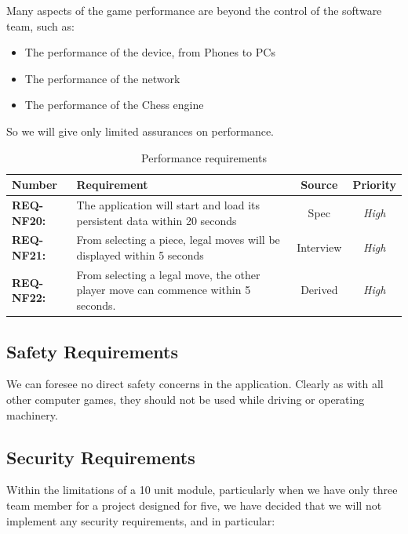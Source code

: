 \documentclass[a4paper,10pt]{article}
\begin{document}
Many aspects of the game performance are beyond the control of the software team, such as:
\begin{itemize}
  \item The performance of the device, from Phones to PCs
  \item The performance of the network
  \item The performance of the Chess engine
\end{itemize}

So we will give only limited assurances on performance. 

\begin{table}[H]
\caption{Performance  requirements}
\label{table:PerfReqs}
\begin{tabular}{|| l | p{10.5cm}  |  c  | c ||} \hline  

\textbf{Number} & \textbf{Requirement} & \textbf{Source} & \textbf{Priority}\\ \hline

\textbf{REQ-NF20:}  & 
The application will start and load its persistent data within 20 seconds
& Spec & \textit{ High} \\

\textbf{REQ-NF21:} 
&  From selecting a piece, legal moves will be displayed within 5 seconds
& Interview  &  \textit{High}\\

\textbf{REQ-NF22:} 
&  From selecting a legal move, the other player move can commence within 5 seconds.
& Derived  &  \textit{High}\\

\hline
\end{tabular}
\end{table}


\subsection{Safety Requirements}

We can foresee no direct safety concerns in the application. Clearly as with all other computer games, they should not be used while driving or operating machinery. 

\subsection{Security Requirements}

Within the limitations of a 10 unit module, particularly when we have only three team member for a project designed for five, we have decided that we will not implement any security requirements, and in particular:
\end{document}
